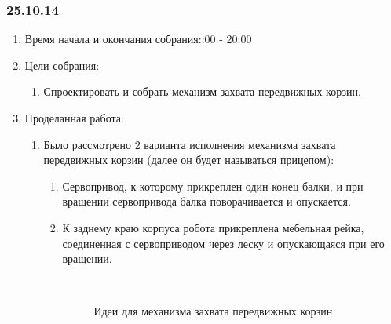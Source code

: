 
\subsubsection{25.10.14}

\begin{enumerate}
	\item Время начала и окончания собрания::00 - 20:00
	\item Цели собрания:\newline
	\begin{enumerate}
	  \item Спроектировать и собрать механизм захвата передвижных корзин.\newline
	  
    \end{enumerate}
    
	\item Проделанная работа:\newline
	\begin{enumerate}
	  \item Было рассмотрено 2 варианта исполнения механизма захвата передвижных корзин (далее он будет называться прицепом):\newline
	  \begin{enumerate}
	    \item Сервопривод, к которому прикреплен один конец балки, и при вращении сервопривода балка поворачивается и опускается.\newline
	    
	    \item К заднему краю корпуса робота прикреплена мебельная рейка, соединенная с сервоприводом через леску и опускающаяся при его вращении.\newline
	    
	    \begin{figure}[H]
	    	\begin{minipage}[h]{0.2\linewidth}
	    		\center   
	    	\end{minipage}
	    	\begin{minipage}[h]{0.6\linewidth}
	    		\caption{Идеи для механизма захвата передвижных корзин}
	    	\end{minipage}
	    \end{figure}
	    

\end{enumerate}
\end{enumerate}
\end{enumerate}
